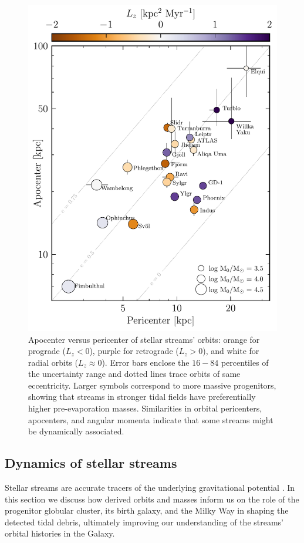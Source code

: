 \documentclass[twocolumn]{aastex63}
\begin{document}
\begin{figure}
\includegraphics[width=\hsize]{figures/streams_peri_apo.pdf}
\caption{
Apocenter versus pericenter of stellar streams' orbits:
orange for prograde ($L_z<0$), purple for retrograde ($L_z>0$), and white for radial orbits ($L_z\approx0$).
Error bars enclose the $16-84$ percentiles of the uncertainty range and dotted lines trace orbits of same eccentricity.
Larger symbols correspond to more massive progenitors, showing that streams in stronger tidal fields have preferentially higher pre-evaporation masses.
Similarities in orbital pericenters, apocenters, and angular momenta indicate that some streams might be dynamically associated.
}
\label{fig:individual_summary}
\end{figure}


\subsection{Dynamics of stellar streams}
\label{sec:discuss_dynamics}
Stellar streams are accurate tracers of the underlying gravitational potential \citep{bh:2018}.
In this section we discuss how derived orbits and masses inform us on the role of the progenitor globular cluster, its birth galaxy, and the Milky Way in shaping the detected tidal debris, ultimately improving our understanding of the streams' orbital histories in the Galaxy.
\end{document}

